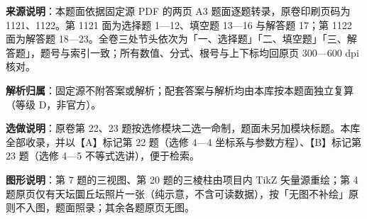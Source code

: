 

\begin{gknotice}
\textbf{来源说明}：本题面依据固定源 PDF 的两页 A3 题面逐题转录，原卷印刷页码为 1121、1122。第 1121 面为选择题 1—12、填空题 13—16 与解答题 17；第 1122 面为解答题 18—23。全卷三处节头依次为「一、选择题」「二、填空题」「三、解答题」，题号与索引一致；所有数值、分式、根号与上下标均回原页 300—600 dpi 核对。

\textbf{解析归属}：固定源不附答案或解析；配套答案与解析均由本库按本题面独立复算（等级 D，非官方）。

\textbf{选做说明}：原卷第 22、23 题按选修模块二选一命制，题面未另加模块标题。本库全部收录，并以【A】标记第 22 题（选修 4—4 坐标系与参数方程）、【B】标记第 23 题（选修 4—5 不等式选讲），便于检索。

\textbf{图形说明}：第 7 题的三视图、第 20 题的三棱柱由项目内 TikZ 矢量源重绘；第 4 题原页仅有天坛圜丘坛照片一张（纯示意，不含可读数据），按「无图不补绘」原则不入图，题面照录；其余各题原页无图。
\end{gknotice}


